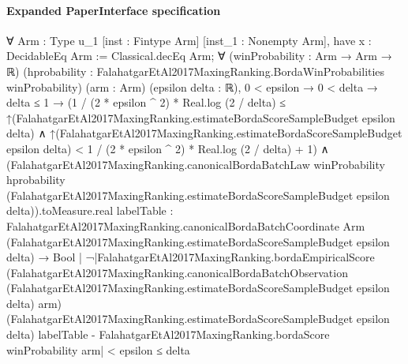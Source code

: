 \documentclass[10pt]{article}
\begin{document}
\paragraph{Expanded PaperInterface specification}
\begin{ReviewVerbatim}
∀ {Arm : Type u_1} [inst : Fintype Arm] [inst_1 : Nonempty Arm],
  have x : DecidableEq Arm := Classical.decEq Arm;
  ∀ (winProbability : Arm → Arm → ℝ)
    (hprobability : FalahatgarEtAl2017MaxingRanking.BordaWinProbabilities winProbability) (arm : Arm)
    (epsilon delta : ℝ),
    0 < epsilon →
      0 < delta →
        delta ≤ 1 →
          (1 / (2 * epsilon ^ 2) * Real.log (2 / delta) ≤
                ↑(FalahatgarEtAl2017MaxingRanking.estimateBordaScoreSampleBudget epsilon delta) ∧
              ↑(FalahatgarEtAl2017MaxingRanking.estimateBordaScoreSampleBudget epsilon delta) <
                1 / (2 * epsilon ^ 2) * Real.log (2 / delta) + 1) ∧
            (FalahatgarEtAl2017MaxingRanking.canonicalBordaBatchLaw winProbability hprobability
                      (FalahatgarEtAl2017MaxingRanking.estimateBordaScoreSampleBudget epsilon delta)).toMeasure.real
                {labelTable :
                  FalahatgarEtAl2017MaxingRanking.canonicalBordaBatchCoordinate Arm
                      (FalahatgarEtAl2017MaxingRanking.estimateBordaScoreSampleBudget epsilon delta) →
                    Bool |
                  ¬|FalahatgarEtAl2017MaxingRanking.bordaEmpiricalScore
                            (FalahatgarEtAl2017MaxingRanking.canonicalBordaBatchObservation
                              (FalahatgarEtAl2017MaxingRanking.estimateBordaScoreSampleBudget epsilon delta) arm)
                            (FalahatgarEtAl2017MaxingRanking.estimateBordaScoreSampleBudget epsilon delta) labelTable -
                          FalahatgarEtAl2017MaxingRanking.bordaScore winProbability arm| <
                      epsilon} ≤
              delta
\end{ReviewVerbatim}
\end{document}
